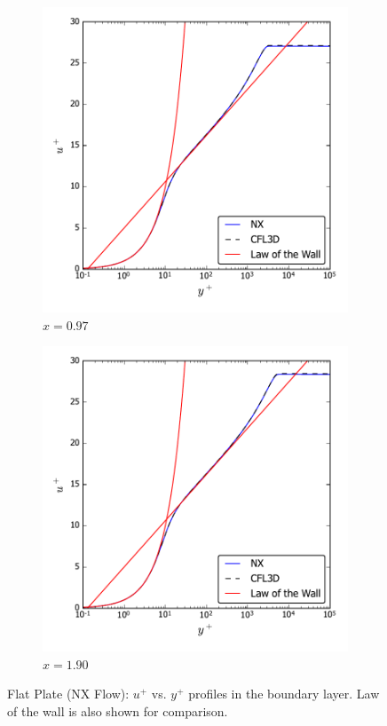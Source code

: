 \begin{figure}[ht!]
\centering
\begin{subfigure}{.45\textwidth}
  \centering
  \includegraphics[width=1.0\textwidth]{figs/flatnx/uyplus_x097.pdf}
  \caption{$x=0.97$}
\end{subfigure}%
\begin{subfigure}{.45\textwidth}
  \centering
  \includegraphics[width=1.0\textwidth]{figs/flatnx/uyplus_x190.pdf}
  \caption{$x=1.90$}
\end{subfigure}
\caption{Flat Plate (NX Flow): $u^+$ vs. $y^+$ profiles in the boundary layer. Law of the wall is also shown for comparison.}
\label{fig:nxflatupyp}
\end{figure}

